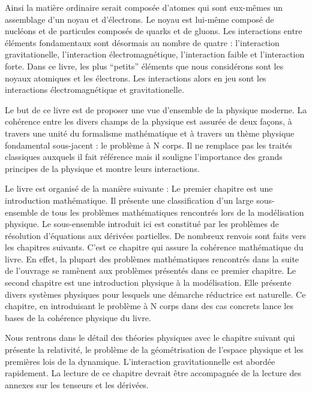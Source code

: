 \documentclass[12pt]{book}
\begin{document}
Ainsi la mati\`ere ordinaire serait compos\'ee d'atomes qui sont
eux-m\^emes un assemblage d'un noyau et d'\'electrons. Le noyau est
lui-m\^eme compos\'e de nucl\'eons et de particules compos\'es de
quarks et de gluons.
Les interactions entre \'el\'ements fondamentaux sont d\'esormais au
nombre de quatre : l'interaction gravitationelle,
l'interaction \'electromagn\'etique, l'interaction faible et
l'interaction forte. 
Dans ce livre, les plus ``petits'' \'el\'ements que nous consid\'erons
sont les noyaux atomiques et les \'electrons. Les interactions alors en
jeu sont les interactions  \'electromagn\'etique et gravitationelle.

Le but de ce livre est de proposer une vue d'ensemble de la physique
moderne. La coh\'erence entre les divers champs de la physique est assur\'ee
de deux fa\c cons, \`a travers une unit\'e du formalisme math\'ematique et \`a
travers un th\`eme physique fondamental sous-jacent : le probl\`eme \`a N
corps. Il ne remplace pas les trait\'es classiques auxquels il fait
r\'ef\'erence mais il souligne l'importance 
des grands principes de la physique et montre leurs interactions. 

Le livre est organis\'e de la mani\`ere suivante :
Le premier chapitre est une introduction math\'ematique. Il pr\'esente une
classification d'un large sous-ensemble de tous les probl\`emes
math\'ematiques rencontr\'es lors de la mod\'elisation physique. Le
sous-ensemble introduit ici est constitu\'e par les probl\`emes de
r\'esolution d'\'equations aux d\'eriv\'ees partielles. De nombreux renvois
sont faits vers les chapitres suivants. 
C'est ce chapitre qui assure la coh\'erence math\'ematique du livre. En effet,
la plupart des probl\`emes math\'ematiques rencontr\'es dans la suite de
l'ouvrage se ram\`enent aux probl\`emes pr\'esent\'es dans ce premier
chapitre. 
Le second chapitre est une introduction physique \`a la mod\'elisation. Elle
pr\'esente divers syst\`emes physiques pour lesquels une d\'emarche
r\'eductrice est naturelle. Ce chapitre, en introduisant le probl\`eme \`a N
corps dans des cas concrets lance les bases de la coh\'erence physique du
livre. 

Nous rentrons dans le d\'etail des th\'eories physiques avec le chapitre
suivant qui pr\'esente la relativit\'e, le probl\`eme de la
g\'eom\'etrisation de l'espace physique et les premi\`eres lois de la
dynamique. L'interaction gravitationnelle est abord\'ee rapidement. La lecture
de ce chapitre devrait \^etre accompagn\'ee
de la lecture des annexes sur les tenseurs et les d\'eriv\'ees.
\end{document}
